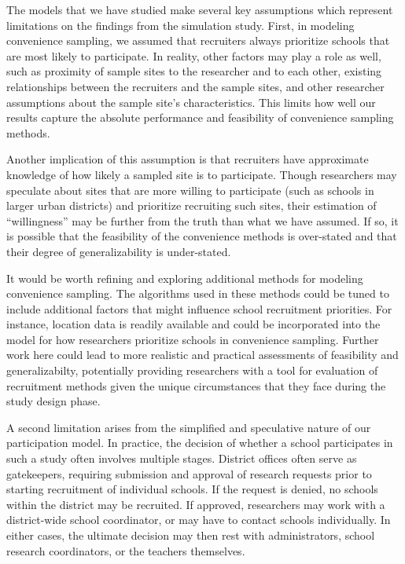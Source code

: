 \documentclass[
  english,
  man,floatsintext]{apa6}
\begin{document}
The models that we have studied make several key assumptions which represent limitations on the findings from the simulation study. First, in modeling convenience sampling, we assumed that recruiters always prioritize schools that are most likely to participate. In reality, other factors may play a role as well, such as proximity of sample sites to the researcher and to each other, existing relationships between the recruiters and the sample sites, and other researcher assumptions about the sample site's characteristics. This limits how well our results capture the absolute performance and feasibility of convenience sampling methods.

Another implication of this assumption is that recruiters have approximate knowledge of how likely a sampled site is to participate. Though researchers may speculate about sites that are more willing to participate (such as schools in larger urban districts) and prioritize recruiting such sites, their estimation of \enquote{willingness} may be further from the truth than what we have assumed. If so, it is possible that the feasibility of the convenience methods is over-stated and that their degree of generalizability is under-stated.

It would be worth refining and exploring additional methods for modeling convenience sampling. The algorithms used in these methods could be tuned to include additional factors that might influence school recruitment priorities. For instance, location data is readily available and could be incorporated into the model for how researchers prioritize schools in convenience sampling. Further work here could lead to more realistic and practical assessments of feasibility and generalizabilty, potentially providing researchers with a tool for evaluation of recruitment methods given the unique circumstances that they face during the study design phase.

A second limitation arises from the simplified and speculative nature of our participation model. In practice, the decision of whether a school participates in such a study often involves multiple stages. District offices often serve as gatekeepers, requiring submission and approval of research requests prior to starting recruitment of individual schools. If the request is denied, no schools within the district may be recruited. If approved, researchers may work with a district-wide school coordinator, or may have to contact schools individually. In either cases, the ultimate decision may then rest with administrators, school research coordinators, or the teachers themselves.
\end{document}
